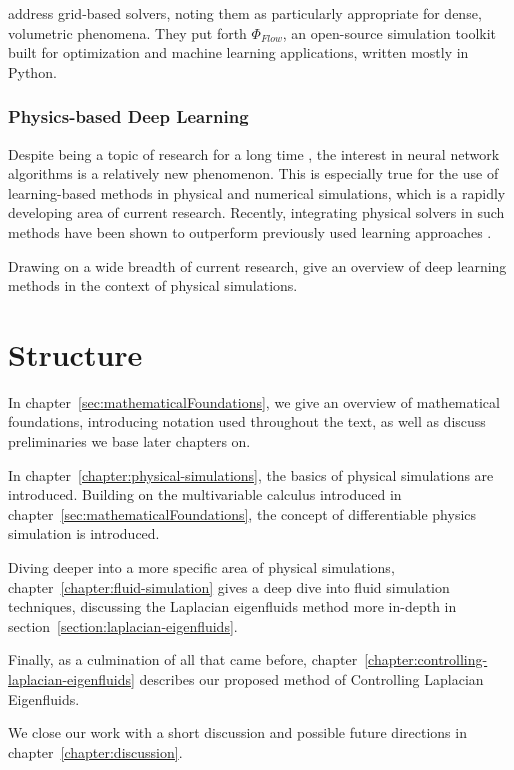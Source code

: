 \citet{holl2019pdecontrol} address grid-based solvers, noting them as
particularly appropriate for dense, volumetric phenomena. They put forth
$\Phi_{Flow}$, an open-source simulation toolkit built for optimization and
machine learning applications, written mostly in Python.

\subsubsection*{Physics-based Deep Learning}
Despite being a topic of research for a long time \cite{backprop}, the
interest in neural network algorithms is a relatively new phenomenon. This is
especially true for the use of learning-based methods in physical and numerical
simulations, which is a rapidly developing area of current research. Recently,
integrating physical solvers in such methods have been shown to outperform
previously used learning approaches \cite{solver-in-the-loop}.

Drawing on a wide breadth of current research, \citet{pbdl} give an overview of
deep learning methods in the context of physical simulations. 

\section{Structure}
In chapter~\ref{sec:mathematicalFoundations}, we give an overview of
mathematical foundations, introducing notation used throughout the text, as well
as discuss  preliminaries we base later chapters on. 

In chapter~\ref{chapter:physical-simulations}, the basics of physical
simulations are introduced. Building on the multivariable calculus introduced in
chapter~\ref{sec:mathematicalFoundations}, the concept of differentiable physics
simulation is introduced. 

Diving deeper into a more specific area of physical simulations,
chapter~\ref{chapter:fluid-simulation} gives a deep dive into fluid simulation
techniques, discussing the Laplacian eigenfluids method more in-depth in
section~\ref{section:laplacian-eigenfluids}. 

Finally, as a culmination of all that came before,
chapter~\ref{chapter:controlling-laplacian-eigenfluids} describes our proposed
method of Controlling Laplacian Eigenfluids. 

We close our work with a short discussion and possible future directions in
chapter~\ref{chapter:discussion}.
